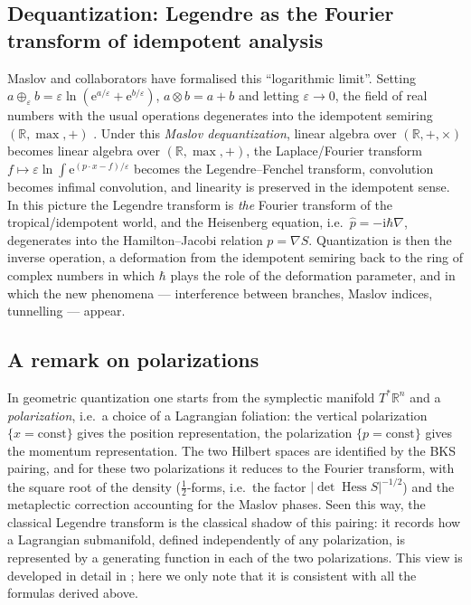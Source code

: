 \documentclass[11pt,a4paper]{article}
\newcommand{\R}{\mathbb{R}}
\newcommand{\ii}{\mathrm{i}}
\newcommand{\ee}{\mathrm{e}}
\newcommand{\hb}{\hbar}
\newcommand{\op}[1]{\hat{#1}}
\newcommand{\Hess}{\operatorname{Hess}}
\theoremstyle{plain}
\theoremstyle{definition}
\theoremstyle{remark}
\begin{document}
\subsection{Dequantization: Legendre as the Fourier transform of idempotent analysis}

Maslov and collaborators have formalised this ``logarithmic limit''. Setting $a\oplus_\varepsilon b=\varepsilon\ln(\ee^{a/\varepsilon}+\ee^{b/\varepsilon})$, $a\otimes b=a+b$ and letting $\varepsilon\to0$, the field of real numbers with the usual operations degenerates into the idempotent semiring $(\R,\max,+)$ \cite{Litvinov,KolokoltsovMaslov}. Under this \emph{Maslov dequantization}, linear algebra over $(\R,+,\times)$ becomes linear algebra over $(\R,\max,+)$, the Laplace/Fourier transform $f\mapsto\varepsilon\ln\int\ee^{(p\cdot x-f)/\varepsilon}$ becomes the Legendre--Fenchel transform, convolution becomes infimal convolution, and linearity is preserved in the idempotent sense. In this picture the Legendre transform is \emph{the} Fourier transform of the tropical/idempotent world, and the Heisenberg equation, i.e.\ $\op p=-\ii\hb\nabla$, degenerates into the Hamilton--Jacobi relation $p=\nabla S$. Quantization is then the inverse operation, a deformation from the idempotent semiring back to the ring of complex numbers in which $\hb$ plays the role of the deformation parameter, and in which the new phenomena --- interference between branches, Maslov indices, tunnelling --- appear.

\subsection{A remark on polarizations}

In geometric quantization \cite{Kostant,Souriau,Woodhouse,GuilleminSternberg} one starts from the symplectic manifold $T^*\R^n$ and a \emph{polarization}, i.e.\ a choice of a Lagrangian foliation: the vertical polarization $\{x=\text{const}\}$ gives the position representation, the polarization $\{p=\text{const}\}$ gives the momentum representation. The two Hilbert spaces are identified by the BKS pairing, and for these two polarizations it reduces to the Fourier transform, with the square root of the density ($\tfrac12$-forms, i.e.\ the factor $|\det\Hess S|^{-1/2}$) and the metaplectic correction accounting for the Maslov phases. Seen this way, the classical Legendre transform is the classical shadow of this pairing: it records how a Lagrangian submanifold, defined independently of any polarization, is represented by a generating function in each of the two polarizations. This view is developed in detail in \cite{Woodhouse,GuilleminSternberg,deGosson1}; here we only note that it is consistent with all the formulas derived above.
\end{document}
